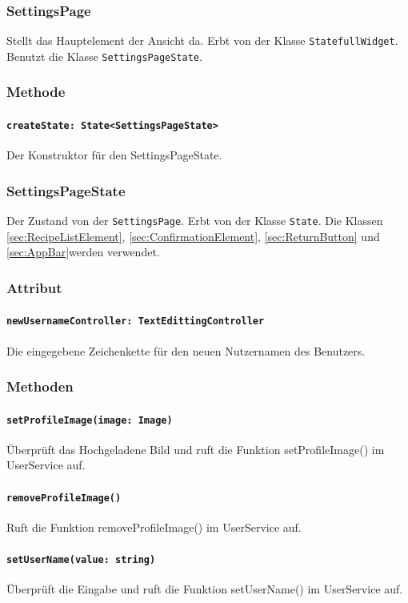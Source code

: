 \documentclass[parskip=full]{scrartcl}
\begin{document}
    \subsubsection{SettingsPage}
    Stellt das Hauptelement der Ansicht da. Erbt von der Klasse \texttt{StatefullWidget}. Benutzt die Klasse \texttt{SettingsPageState}.
        \subsubsection*{Methode}
            \paragraph*{\texttt{createState: State<SettingsPageState>}} Der Konstruktor für den SettingsPageState.
    
    \subsubsection{SettingsPageState}
    Der Zustand von der \texttt{SettingsPage}. Erbt von der Klasse \texttt{State}. Die Klassen \ref{sec:RecipeListElement}, \ref{sec:ConfirmationElement}, \ref{sec:ReturnButton} und \ref{sec:AppBar}werden verwendet.
        \subsubsection*{Attribut}
            \paragraph*{\texttt{newUsernameController: TextEdittingController}} Die eingegebene Zeichenkette für den neuen Nutzernamen des Benutzers.

        \subsubsection*{Methoden}
            \paragraph*{\texttt{setProfileImage(image: Image)}} Überprüft das Hochgeladene Bild und ruft die Funktion setProfileImage() im UserService auf.
            \paragraph*{\texttt{removeProfileImage()}} Ruft die Funktion removeProfileImage() im UserService auf.
            \paragraph*{\texttt{setUserName(value: string)}} Überprüft die Eingabe und ruft die Funktion setUserName() im UserService auf.
\end{document}
